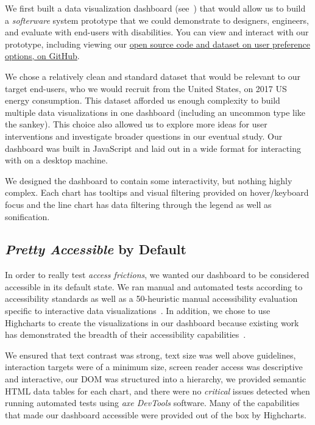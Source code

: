 \documentclass[12pt]{cmuthesis}
\begin{document}
We first built a data visualization dashboard (see~) that would allow us to build a \textit{softerware} system prototype that we could demonstrate to designers, engineers, and evaluate with end-users with disabilities. You can view and interact with our prototype, including viewing our \href{https://github.com/highcharts/highcharts-a11y-prototyping}{open source code and dataset on user preference options, on GitHub}.

We chose a relatively clean and standard dataset that would be relevant to our target end-users, who we would recruit from the United States, on 2017 US energy consumption. This dataset afforded us enough complexity to build multiple data visualizations in one dashboard (including an uncommon type like the sankey). This choice also allowed us to explore more ideas for user interventions and investigate broader questions in our eventual study. Our dashboard was built in JavaScript and laid out in a wide format for interacting with on a desktop machine.

We designed the dashboard to contain some interactivity, but nothing highly complex. Each chart has tooltips and visual filtering provided on hover/keyboard focus and the line chart has data filtering through the legend as well as sonification.

\subsection{\textit{Pretty Accessible} by Default}
In order to really test \textit{access frictions}, we wanted our dashboard to be considered accessible in its default state. We ran manual and automated tests according to accessibility standards as well as a 50-heuristic manual accessibility evaluation specific to interactive data visualizations~\cite{Elavsky2022Chartability, WCAG}. In addition, we chose to use Highcharts to create the visualizations in our dashboard because existing work has demonstrated the breadth of their accessibility capabilities~\cite{Kim2023Beyond}.

We ensured that text contrast was strong, text size was well above guidelines, interaction targets were of a minimum size, screen reader access was descriptive and interactive, our DOM was structured into a hierarchy, we provided semantic HTML data tables for each chart, and there were no \textit{critical} issues detected when running automated tests using \textit{axe DevTools} software. Many of the capabilities that made our dashboard accessible were provided out of the box by Highcharts.
\end{document}
